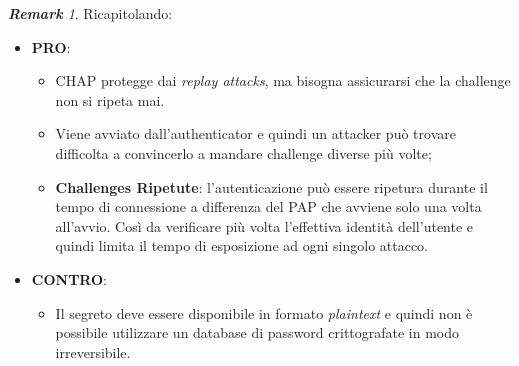 \documentclass{article}
\theoremstyle{remark}
\newtheorem*{remark}{\textbf{Remark}}
\begin{document}
\begin{remark}
	Ricapitolando:\begin{itemize}
		\item \textbf{PRO}:\begin{itemize}
			      \item CHAP protegge dai \emph{replay attacks}, ma bisogna assicurarsi che la challenge non si ripeta mai.
			      \item Viene avviato dall'authenticator e quindi un attacker può trovare difficolta a convincerlo a mandare challenge diverse più volte;
			      \item \textbf{Challenges Ripetute}: l'autenticazione può essere ripetura durante il tempo di connessione a differenza del PAP che avviene solo una volta all'avvio. Così da verificare più volta l'effettiva identità dell'utente e quindi limita il tempo di esposizione ad ogni singolo attacco.
		      \end{itemize}
		\item \textbf{CONTRO}:\begin{itemize}
			      \item Il segreto deve essere disponibile in formato \emph{plaintext} e quindi non è possibile utilizzare un database di password crittografate in modo irreversibile.
		      \end{itemize}
	\end{itemize}
\end{remark}
\end{document}
